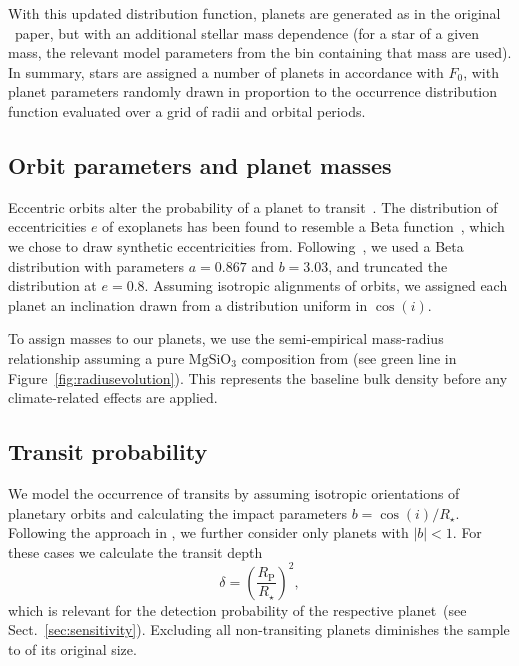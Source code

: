 \documentclass[twocolumn,twocolappendix]{aastex631}
\begin{document}
With this updated distribution function, planets are generated as in the original \bioverse\ paper, but with an additional stellar mass dependence (for a star of a given mass, the relevant model parameters from the bin containing that mass are used). In summary, stars are assigned a number of planets in accordance with $F_0$, with planet parameters randomly drawn in proportion to the occurrence distribution function evaluated over a grid of radii and orbital periods.

\subsection{Orbit parameters and planet masses}\label{sec:met-orbits_masses}
Eccentric orbits alter the probability of a planet to transit~\citep[e.g.,][]{Barnes2007a}.
The distribution of eccentricities $e$ of exoplanets has been found to resemble a Beta function~\citep{Kipping2013b}, which we chose to draw synthetic eccentricities from.
Following~\citet{Kipping2013b}, we used a Beta distribution with parameters $a=0.867$ and $b=3.03$, and truncated the distribution at $e = 0.8$.
Assuming isotropic alignments of orbits, we assigned each planet an inclination drawn from a distribution uniform in $\cos(i)$.

To assign masses to our planets, we use the semi-empirical mass-radius relationship assuming a pure $\mathrm{MgSiO_3}$ composition from \citet{Zeng2016} (see green line in Figure~\ref{fig:radiusevolution}).
This represents the baseline bulk density before any climate-related effects are applied.


\subsection{Transit probability}
We model the occurrence of transits by assuming isotropic orientations of planetary orbits and calculating the impact parameters $b = \cos(i)/R_\star$.
Following the approach in \citet{Bixel2021}, we further consider only planets with $|b| < 1$.
For these cases we calculate the transit depth
\begin{equation}\label{eq:transitdepth}
    \delta = \left( \frac{R_\mathrm{P}}{R_\star} \right)^2,
\end{equation}
which is relevant for the detection probability of the respective planet~(see Sect.~\ref{sec:sensitivity}).
Excluding all non-transiting planets diminishes the sample to  of its original size.
\end{document}
